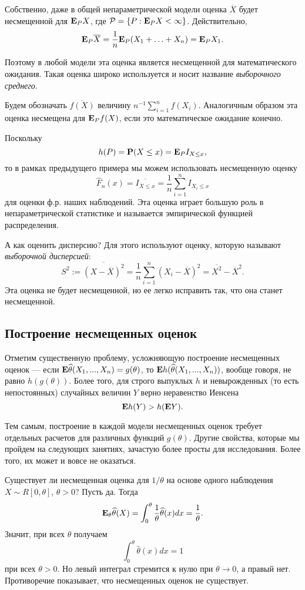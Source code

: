 \documentclass[10 pt,russian]{report}
\begin{document}
\Exam Собственно, даже в общей непараметрической модели оценка $\overline{X}$ будет несмещенной для ${\bf E}_P X$,  где $\mathcal{P}=\{P: {\bf E}_P X<\infty\}$. Действительно, 
$${\bf E}_{P} \overline{X}=  \frac1n {\bf E}_P (X_1+\dotsc +X_n)= {\bf E}_P X_1.
$$

Поэтому в любой модели эта оценка является несмещенной для математического ожидания. Такая оценка широко используется и носит название {\it выборочного среднего}. 

Будем обозначать $\overline{f(X)}$ величину $n^{-1} \sum_{i=1}^{n} f(X_i)$. Аналогичным образом эта оценка несмещена для ${\bf E}_P f(X)$, если это математическое ожидание конечно.

\Exam Поскольку
$$
h(P) = {\bf P}(X\le x) = {\bf E}_{P} I_{X\le x},
$$
то в рамках предыдущего примера мы можем использовать несмещенную оценку
$$
\widehat{F}_n(x) = \overline{I_{X\le x}} = \frac1n \sum_{i=1}^{n} I_{X_i\le x}
$$
для оценки ф.р. наших наблюдений. Эта оценка играет большую роль в непараметрической статистике и называется эмпирической функцией распределения.

\Exam А как оценить дисперсию? Для этого используют оценку, которую называют {\it выборочной дисперсией}:
$$
S^2:= \overline{(X-\overline{X})^2} = \frac1n \sum_{i=1}^{n} (X_i- \overline{X})^2 = \overline{X^2} - \overline{X}^2.
$$
Эта оценка не будет несмещенной, но ее легко исправить так, что она станет несмещенной.
\subsection{Построение несмещенных оценок}
Отметим существенную проблему, усложняющую построение несмещенных оценок --- если ${\bf E}\widehat{\theta}(X_1,...,X_n) = g(\theta)$, то 
${\bf E}h(\widehat{\theta}(X_1,...,X_n))$, вообще говоря, не равно $h(g(\theta))$. Более того, для строго выпуклых $h$ и невырожденных (то есть непостоянных) случайных величин $Y$  верно неравенство Иенсена
$$
{\bf E}h(Y) > h({\bf E} Y).
$$

Тем самым, построение в каждой модели несмещенных оценок требует отдельных расчетов для различных функций $g(\theta)$. Другие свойства, которые мы пройдем на следующих занятиях, зачастую более просты для исследования. Более того, их может и вовсе не оказаться.

\Exam Существует ли несмещенная оценка для $1/\theta$ на основе одного наблюдения $X\sim R[0,\theta]$, $\theta>0$? Пусть да. Тогда
$$
{\bf E}_{\theta}\widehat{\theta}(X) = \int_0^{\theta} \frac{1}{\theta} \widehat{\theta}(x) dx = \frac1{\theta}.
$$
Значит, при всех $\theta$ получаем 
$$
\int_0^{\theta} \widehat{\theta}(x) dx = 1
$$
при всех $\theta>0$. Но левый интеграл стремится к нулю при $\theta\to 0$, а правый нет. Противоречие показывает, что несмещенных оценок не существует.
\end{document}
